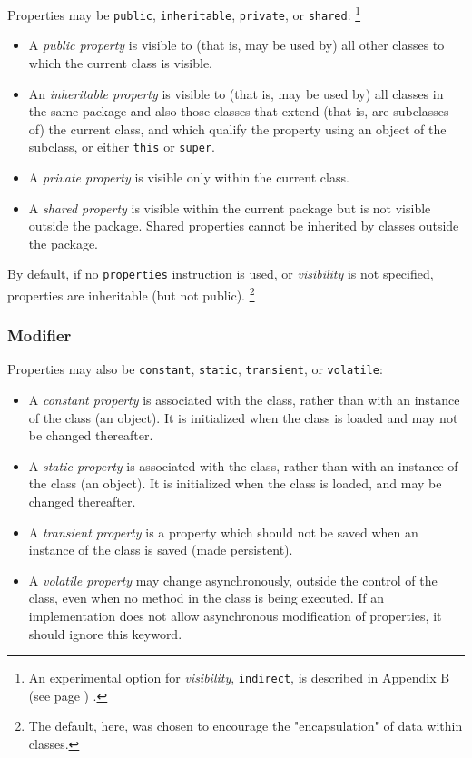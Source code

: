 Properties may be \texttt{public}, \texttt{inheritable},
\texttt{private}, or \texttt{shared}:
\footnote{
An experimental option for \emph{visibility}, \texttt{indirect},
is described in  Appendix B (see page \pageref{refappb}) .
}
\begin{itemize}
\item A \emph{public property} is visible to (that is, may be used by)
all other classes to which the current class is visible.
\item An \emph{inheritable property} is visible to (that is, may be used
by) all classes in the same package and also those classes that extend
(that is, are subclasses of) the current class, and which qualify the
property using an object of the subclass, or either \texttt{this}
or \texttt{super}.
\item A \emph{private property} is visible only within the current
class.
\item 
A \emph{shared property} is visible within the current package
but is not visible outside the package.  Shared properties cannot be
inherited by classes outside the package.
\end{itemize}
 
By default, if no \texttt{properties} instruction is used,
or \emph{visibility} is not specified, properties
are inheritable (but not public).
\footnote{
The default, here, was chosen to encourage the "encapsulation" of
data within classes.
}
\subsubsection{Modifier}\label{"id"}
 
Properties may also be \texttt{constant}, \texttt{static},
\texttt{transient}, or \texttt{volatile}:
\begin{itemize}
\item 
A \emph{constant property} is associated with the class, rather
than with an instance of the class (an object).
It is initialized when the class is loaded and may not be changed
thereafter.
\item 
A \emph{static property} is associated with the class, rather
than with an instance of the class (an object).
It is initialized when the class is loaded, and may be changed
thereafter.
\item 
A \emph{transient property} is a property which should not be saved when
an instance of the class is saved (made persistent).
\item 
A \emph{volatile property} may change asynchronously, outside the
control of the class, even when no method in the class is being
executed.
If an implementation does not allow asynchronous modification of
properties, it should ignore this keyword.
\end{itemize}
 
